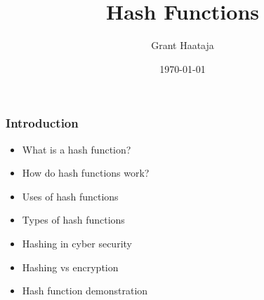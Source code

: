 \documentclass{beamer}
\title{Hash Functions}
\author{Grant Haataja}
\date{\today}
\begin{document}
\begin{frame}
	\titlepage
\end{frame}	

\begin{frame}
	\frametitle{Introduction}
	\begin{itemize}
		\item What is a hash function?
		\item How do hash functions work?
		\item Uses of hash functions
		\item Types of hash functions
		\item Hashing in cyber security 
		\item Hashing vs encryption 
		\item Hash function demonstration
		
	\end{itemize}
\end{frame}
	
\end{document}
